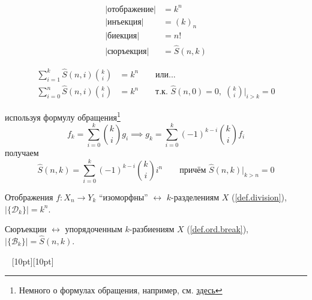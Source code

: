 \documentclass[a4paper,12pt]{article}
\numberwithin{figure}{section}
\theoremstyle{definition}
\theoremstyle{definition}
\begin{document}
\begin{align*}
	|\text{отображение}| &= k^n \\
	|\text{инъекция}| &= (k)_n \\
	|\text{биекция}| &= n! \\
	|\text{сюръекция}| &= \hat{S}(n,k)
\end{align*}

\begin{align*}
	\sum_{i=1}^k{ \hat{S}(n,i) \binom{k}{i} } &= k^n   \qquad \text{или...}  \\
   	\sum_{i=0}^n{ \hat{S}(n,i) \binom{k}{i} } &= k^n
   	\qquad \text{т.к. } \hat{S}(n,0)=0, \; \binom{k}{i}\biggr|_{i>k}=0
\end{align*}

используя формулу обращения\footnote{Немного о формулах обращения, например, см. \href{http://iskhacov.narod.ru/materials/combinators.pdf}{здесь}}
\[ f_k = \sum_{i=0}^k{ \binom{k}{i} g_i } \implies
   g_k = \sum_{i=0}^k{ (-1)^{k-i} \binom{k}{i} f_i } \]
получаем
\[ \hat{S}(n,k) = \sum_{i=0}^k{ (-1)^{k-i} \binom{k}{i} i^n }
   \qquad \text{причём } \hat{S}(n,k)\bigr|_{k>n}=0 \]

Отображения $f: X_n \rightarrow Y_k$ ``изоморфны'' $\longleftrightarrow$ $k$-разделениям $X$ (\ref{def.division}), $|\{\mathcal{D}_k\}|=k^n$.

Сюръекции $\longleftrightarrow$ упорядоченным $k$-разбиениям $X$ (\ref{def.ord.break}), $|\{\mathcal{B}_k\}|=\hat{S}(n,k)$.




\vspace{80pt} \noindent \hrulefill~ \raisebox{-8pt}[10pt][10pt]{\Large{}}~ \hrulefill
\end{document}

